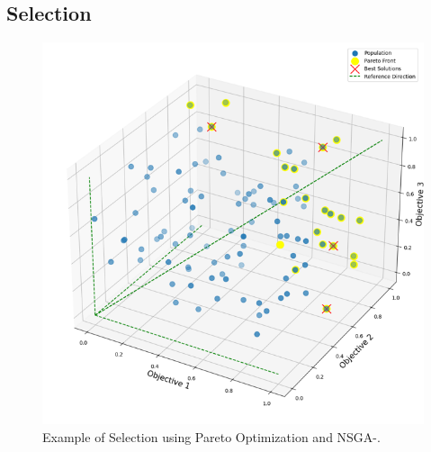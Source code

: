 \documentclass[10pt,conference]{IEEEtran}
\begin{document}
    \subsection{Selection}\label{Selection}

        \begin{figure}[H]
            \centering
            \includegraphics[scale=0.4]{NSGA3.png}
            \caption{Example of Selection using Pareto Optimization and NSGA-\uppercase\expandafter{}.}
            \label{nsga3}
        \end{figure}
\end{document}
